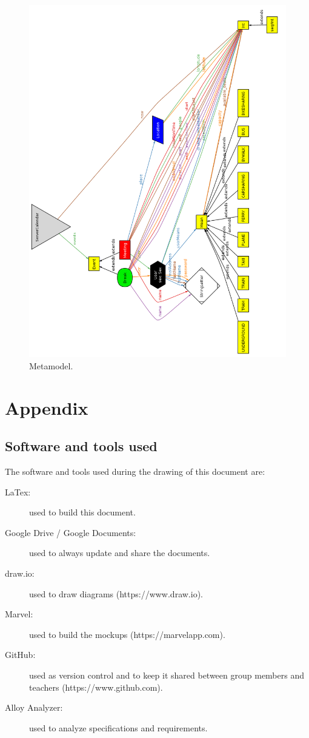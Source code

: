 \documentclass{article}
\begin{document}
	\begin{figure}[h!]
		\bigskip
		\centering
		\includegraphics[scale=0.5]{img/diagrams/mm.png}
		\caption{Metamodel.}
	\end{figure}
	\newpage
	\appendix
	\section{Appendix}

	\subsection{Software and tools used}
	The software and tools used during the drawing of this document are:
	\begin{description}
		\item[LaTex:] used to build this document.
		\item[Google Drive / Google Documents:] used to always update and share the documents.
		\item[draw.io:] used to draw diagrams (https://www.draw.io).
		\item[Marvel:] used to build the mockups (https://marvelapp.com).
		\item[GitHub:] used as version control and to keep it shared between group members and teachers (https://www.github.com).
		\item[Alloy Analyzer:] used to analyze specifications and requirements.
	\end{description}
\end{document}
